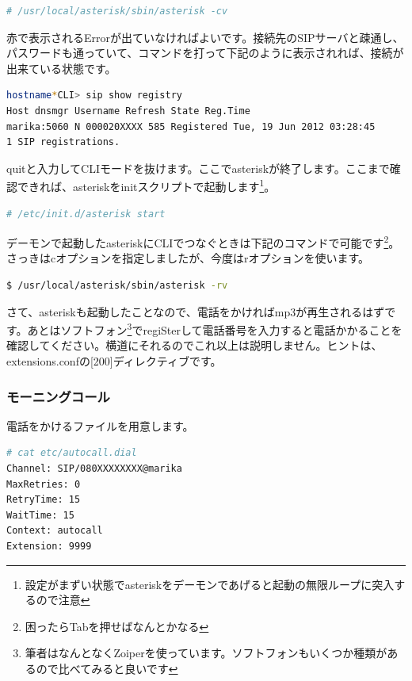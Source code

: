 \begin{lstlisting}[language=bash]
# /usr/local/asterisk/sbin/asterisk -cv
\end{lstlisting}

赤で表示されるErrorが出ていなければよいです。接続先のSIPサーバと疎通し、パスワードも通っていて、コマンドを打って下記のように表示されれば、接続が出来ている状態です。

\begin{lstlisting}[language=bash]
hostname*CLI> sip show registry 
Host dnsmgr Username Refresh State Reg.Time 
marika:5060 N 000020XXXX 585 Registered Tue, 19 Jun 2012 03:28:45
1 SIP registrations. 
\end{lstlisting}

quitと入力してCLIモードを抜けます。ここでasteriskが終了します。ここまで確認できれば、asteriskをinitスクリプトで起動します\footnote{設定がまずい状態でasteriskをデーモンであげると起動の無限ループに突入するので注意}。

\begin{lstlisting}[language=bash]
# /etc/init.d/asterisk start
\end{lstlisting}

デーモンで起動したasteriskにCLIでつなぐときは下記のコマンドで可能です\footnote{困ったらTabを押せばなんとかなる}。さっきはcオプションを指定しましたが、今度はrオプションを使います。

\begin{lstlisting}[language=bash]
$ /usr/local/asterisk/sbin/asterisk -rv
\end{lstlisting}

さて、asteriskも起動したことなので、電話をかければmp3が再生されるはずです。あとはソフトフォン\footnote{筆者はなんとなくZoiperを使っています。ソフトフォンもいくつか種類があるので比べてみると良いです}でregiSterして電話番号を入力すると電話かかることを確認してください。横道にそれるのでこれ以上は説明しません。ヒントは、extensions.confの[200]ディレクティブです。

\subsubsection{モーニングコール}
電話をかけるファイルを用意します。

\begin{lstlisting}[language=bash]
# cat etc/autocall.dial 
Channel: SIP/080XXXXXXXX@marika
MaxRetries: 0
RetryTime: 15
WaitTime: 15
Context: autocall
Extension: 9999
\end{lstlisting}

